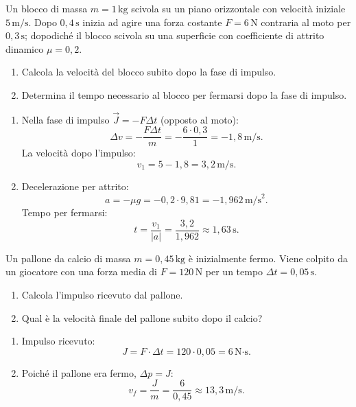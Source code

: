 \begin{question}[ID=1.5, subtitle={Variazione di velocità con impulso e attrito}, tags={impulso, attrito}, difficulty=difficile]
Un blocco di massa \(m = 1 \, \text{kg}\) scivola su un piano orizzontale con velocità iniziale \(5 \, \text{m/s}\). Dopo \(0{,}4 \, \text{s}\) inizia ad agire una forza costante \(F = 6 \, \text{N}\) contraria al moto per \(0{,}3 \, \text{s}\); dopodiché il blocco scivola su una superficie con coefficiente di attrito dinamico \(\mu = 0{,}2\).
\begin{enumerate}
    \item Calcola la velocità del blocco subito dopo la fase di impulso.
    \item Determina il tempo necessario al blocco per fermarsi dopo la fase di impulso.
\end{enumerate}
\begin{solution}
    \begin{enumerate}
        \item Nella fase di impulso \(\vec{J} = -F\Delta t\) (opposto al moto):
        \[
            \Delta v = -\frac{F \Delta t}{m} = -\frac{6 \cdot 0{,}3}{1} = -1{,}8 \, \text{m/s}.
        \]
        La velocità dopo l'impulso:
        \[
            v_1 = 5 - 1{,}8 = 3{,}2 \, \text{m/s}.
        \]
        \item Decelerazione per attrito:
        \[
            a = -\mu g = -0{,}2 \cdot 9{,}81 = -1{,}962 \, \text{m/s}^2.
        \]
        Tempo per fermarsi:
        \[
            t = \frac{v_1}{|a|} = \frac{3{,}2}{1{,}962} \approx 1{,}63 \, \text{s}.
        \]
    \end{enumerate}
\end{solution}
\end{question}


\begin{question}[ID=1.6, subtitle={Velocità di un pallone dopo un calcio}, tags={impulso}, difficulty=media]
Un pallone da calcio di massa \(m = 0{,}45 \, \text{kg}\) è inizialmente fermo. Viene colpito da un giocatore con una forza media di \(F = 120 \, \text{N}\) per un tempo \(\Delta t = 0{,}05 \, \text{s}\).
\begin{enumerate}
    \item Calcola l'impulso ricevuto dal pallone.
    \item Qual è la velocità finale del pallone subito dopo il calcio?
\end{enumerate}
\begin{solution}
    \begin{enumerate}
        \item Impulso ricevuto:
        \[
            J = F \cdot \Delta t = 120 \cdot 0{,}05 = 6 \, \text{N·s}.
        \]
        \item Poiché il pallone era fermo, \(\Delta p = J\):
        \[
            v_f = \frac{J}{m} = \frac{6}{0{,}45} \approx 13{,}3 \, \text{m/s}.
        \]
    \end{enumerate}
\end{solution}
\end{question}

